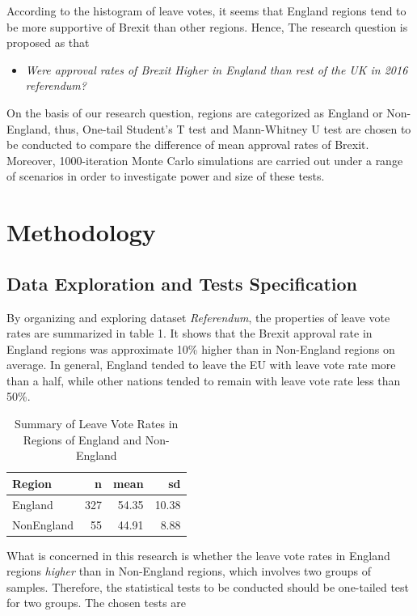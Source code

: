 \documentclass[]{article}
\providecommand{\tightlist}{%
  \setlength{\itemsep}{0pt}\setlength{\parskip}{0pt}}
\begin{document}
According to the histogram of leave votes, it seems that England regions
tend to be more supportive of Brexit than other regions. Hence, The
research question is proposed as that

\begin{itemize}
\tightlist
\item
  \emph{Were approval rates of Brexit Higher in England than rest of the
  UK in 2016 referendum?}
\end{itemize}

On the basis of our research question, regions are categorized as
England or Non-England, thus, One-tail Student's T test and Mann-Whitney
U test are chosen to be conducted to compare the difference of mean
approval rates of Brexit. Moreover, 1000-iteration Monte Carlo
simulations are carried out under a range of scenarios in order to
investigate power and size of these tests.

\hypertarget{methodology}{%
\section{Methodology}\label{methodology}}

\hypertarget{data-exploration-and-tests-specification}{%
\subsection{Data Exploration and Tests
Specification}\label{data-exploration-and-tests-specification}}

By organizing and exploring dataset \emph{Referendum}, the properties of
leave vote rates are summarized in table 1. It shows that the Brexit
approval rate in England regions was approximate 10\% higher than in
Non-England regions on average. In general, England tended to leave the
EU with leave vote rate more than a half, while other nations tended to
remain with leave vote rate less than 50\%.

\begin{longtable}[t]{lrrr}
\caption{\label{tab:dataset}Summary of Leave Vote Rates in Regions of England and Non-England}\\
\toprule
Region & n & mean & sd\\
\midrule
England & 327 & 54.35 & 10.38\\
NonEngland & 55 & 44.91 & 8.88\\
\bottomrule
\end{longtable}

What is concerned in this research is whether the leave vote rates in
England regions \emph{higher} than in Non-England regions, which
involves two groups of samples. Therefore, the statistical tests to be
conducted should be one-tailed test for two groups. The chosen tests are
\end{document}
